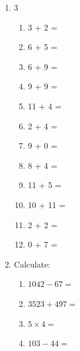 \documentclass{tufte-book}
\begin{document}
\begin{enumerate}
  \item
  \begin{multicols}{3}
    \begin{enumerate}\bigskip
      \item 3 + 2 = \dotfill\bigskip
      \item 6 + 5 = \dotfill\bigskip
      \item 6 + 9 = \dotfill\bigskip
      \item 9 + 9 = \dotfill
      \item 11 + 4 = \dotfill\bigskip
      \item 2 + 4 = \dotfill\bigskip
      \item 9 + 0 = \dotfill\bigskip
      \item 8 + 4 = \dotfill
      \item 11 + 5 = \dotfill\bigskip
      \item 10 + 11 = \dotfill\bigskip
      \item 2 + 2 = \dotfill\bigskip
      \item 0 + 7 = \dotfill
    \end{enumerate}
    \end{multicols}

  \item Calculate:
  \begin{enumerate}\bigskip
    \item $1042 - 67=$\dotfill\bigskip
    \item $3523 + 497=$\dotfill\bigskip
    \item $5 \times 4=$\dotfill\bigskip
    \item $103 - 44=$\dotfill
  \end{enumerate}
\end{enumerate}
\end{document}
